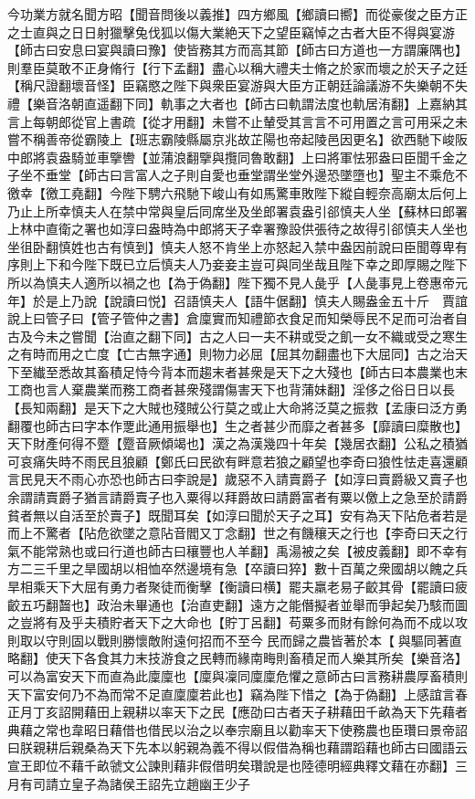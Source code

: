 今功業方就名聞方昭【聞音問後以義推】四方鄉風【鄉讀曰嚮】而從豪俊之臣方正之士直與之日日射獵擊兔伐狐以傷大業絶天下之望臣竊悼之古者大臣不得與宴游【師古曰安息曰宴與讀曰豫】使皆務其方而高其節【師古曰方道也一方謂廉隅也】則羣臣莫敢不正身脩行【行下孟翻】盡心以稱大禮夫士脩之於家而壞之於天子之廷【稱尺證翻壞音怪】臣竊愍之陛下與衆臣宴游與大臣方正朝廷論議游不失樂朝不失禮【樂音洛朝直遥翻下同】軌事之大者也【師古曰軌謂法度也軌居洧翻】上嘉納其言上每朝郎從官上書疏【從才用翻】未嘗不止輦受其言言不可用置之言可用采之未嘗不稱善帝從霸陵上【班志霸陵縣屬京兆故芷陽也帝起陵邑因更名】欲西馳下峻阪中郎將袁盎騎並車擥轡【並蒲浪翻擥與攬同魯敢翻】上曰將軍怯邪盎曰臣聞千金之子坐不垂堂【師古曰言富人之子則自愛也垂堂謂坐堂外邊恐墜墮也】聖主不乘危不徼幸【徼工堯翻】今陛下騁六飛馳下峻山有如馬驚車敗陛下縱自輕奈高廟太后何上乃止上所幸慎夫人在禁中常與皇后同席坐及坐郎署袁盎引郤慎夫人坐【蘇林曰郎署上林中直衛之署也如淳曰盎時為中郎將天子幸署豫設供張待之故得引郤慎夫人坐也坐徂卧翻慎姓也古有慎到】慎夫人怒不肯坐上亦怒起入禁中盎因前說曰臣聞尊卑有序則上下和今陛下既已立后慎夫人乃妾妾主豈可與同坐哉且陛下幸之即厚賜之陛下所以為慎夫人適所以禍之也【為于偽翻】陛下獨不見人彘乎【人彘事見上卷惠帝元年】於是上乃說【說讀曰悦】召語慎夫人【語牛倨翻】慎夫人賜盎金五十斤　賈誼說上曰管子曰【管子管仲之書】倉廩實而知禮節衣食足而知榮辱民不足而可治者自古及今未之嘗聞【治直之翻下同】古之人曰一夫不耕或受之飢一女不織或受之寒生之有時而用之亡度【亡古無字通】則物力必屈【屈其勿翻盡也下大屈同】古之治天下至纎至悉故其畜積足恃今背本而趨末者甚衆是天下之大殘也【師古曰本農業也末工商也言人棄農業而務工商者甚衆殘謂傷害天下也背蒲妹翻】淫侈之俗日日以長【長知兩翻】是天下之大賊也殘賊公行莫之或止大命將泛莫之振救【孟康曰泛方勇翻覆也師古曰字本作覂此通用振舉也】生之者甚少而靡之者甚多【靡讀曰糜散也】天下財產何得不蹷【蹷音厥傾竭也】漢之為漢幾四十年矣【幾居衣翻】公私之積猶可哀痛失時不雨民且狼顧【鄭氏曰民欲有畔意若狼之顧望也李奇曰狼性怯走喜還顧言民見天不雨心亦恐也師古曰李說是】歲惡不入請賣爵子【如淳曰賣爵級又賣子也余謂請賣爵子猶言請爵賣子也入粟得以拜爵故曰請爵富者有粟以儌上之急至於請爵貧者無以自活至於賣子】既聞耳矣【如淳曰聞於天子之耳】安有為天下阽危者若是而上不驚者【阽危欲墜之意阽音閻又丁念翻】世之有饑穰天之行也【李奇曰天之行氣不能常熟也或曰行道也師古曰穰豐也人羊翻】禹湯被之矣【被皮義翻】即不幸有方二三千里之旱國胡以相恤卒然邊境有急【卒讀曰猝】數十百萬之衆國胡以餽之兵旱相乘天下大屈有勇力者聚徒而衡擊【衡讀曰横】罷夫羸老易子齩其骨【罷讀曰疲齩五巧翻齧也】政治未畢通也【治直吏翻】遠方之能僭擬者並舉而爭起矣乃駭而圖之豈將有及乎夫積貯者天下之大命也【貯丁呂翻】苟粟多而財有餘何為而不成以攻則取以守則固以戰則勝懷敵附遠何招而不至今民而歸之農皆著於本【與驅同著直略翻】使天下各食其力末技游食之民轉而緣南畮則畜積足而人樂其所矣【樂音洛】可以為富安天下而直為此廩廩也【廩與凜同廩廩危懼之意師古曰言務耕農厚畜積則天下富安何乃不為而常不足直廩廩若此也】竊為陛下惜之【為于偽翻】上感誼言春正月丁亥詔開藉田上親耕以率天下之民【應劭曰古者天子耕藉田千畝為天下先藉者典藉之常也韋昭日藉借也借民以治之以奉宗廟且以勸率天下使務農也臣瓚曰景帝詔曰朕親耕后親桑為天下先本以躬親為義不得以假借為稱也藉謂蹈藉也師古曰國語云宣王即位不藉千畝虢文公諫則藉非假借明矣瓚說是也陸德明經典釋文藉在亦翻】三月有司請立皇子為諸侯王詔先立趙幽王少子

